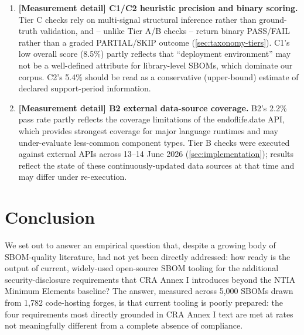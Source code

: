 \documentclass[11pt]{article}
\begin{document}
\begin{enumerate}[label=\arabic*.,leftmargin=*]
\item \textbf{[Measurement detail] C1/C2 heuristic precision and binary scoring.} Tier C checks rely on multi-signal structural inference rather than ground-truth validation, and -- unlike Tier A/B checks -- return binary PASS/FAIL rather than a graded PARTIAL/SKIP outcome (\cref{sec:taxonomy-tiers}). C1's low overall score (8.5\%) partly reflects that ``deployment environment'' may not be a well-defined attribute for library-level SBOMs, which dominate our corpus. C2's 5.4\% should be read as a conservative (upper-bound) estimate of declared support-period information.

\item \textbf{[Measurement detail] B2 external data-source coverage.} B2's 2.2\% pass rate partly reflects the coverage limitations of the endoflife.date API, which provides strongest coverage for major language runtimes and may under-evaluate less-common component types. Tier B checks were executed against external APIs across 13--14 June 2026 (\cref{sec:implementation}); results reflect the state of these continuously-updated data sources at that time and may differ under re-execution.
\end{enumerate}

\section{Conclusion}
\label{sec:conclusion}

We set out to answer an empirical question that, despite a growing body of SBOM-quality literature, had not yet been directly addressed: how ready is the output of current, widely-used open-source SBOM tooling for the additional security-disclosure requirements that CRA Annex I introduces beyond the NTIA Minimum Elements baseline? The answer, measured across 5,000 SBOMs drawn from 1,782 code-hosting forges, is that current tooling is poorly prepared: the four requirements most directly grounded in CRA Annex I text are met at rates not meaningfully different from a complete absence of compliance.
\end{document}
